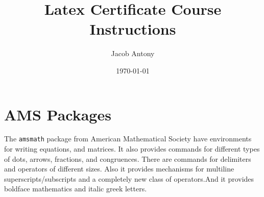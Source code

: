 \documentclass{article}
\title{Latex Certificate Course Instructions}
\author{Jacob Antony}
\date{\today}
\begin{document}
\maketitle

\section{AMS Packages}
The \texttt{amsmath} package from American Mathematical Society have environments for writing equations, and matrices. It also provides commands for different types of dots, arrows, fractions, and congruences. There are commands for delimiters and operators of different sizes. Also it provides mechanisms for multiline superscripts/subscripts and a completely new class of operators.And it provides boldface mathematics and italic greek letters.
\end{document}
